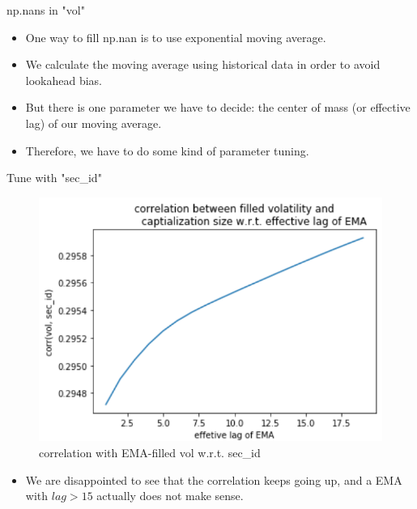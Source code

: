 \documentclass{beamer}
\renewcommand{\indent}{\hspace*{2em}}
\begin{document}

\begin{frame}{np.nans in "vol"}
\begin{itemize}
\item One way to fill np.nan is to use exponential moving average.
\item We calculate the moving average using historical data in order to avoid lookahead bias.
\item But there is one parameter we have to decide: the center of mass (or effective lag) of our moving average.
\item Therefore, we have to do some kind of parameter tuning.
\end{itemize}
\end{frame}

\begin{frame}{Tune with "sec\_id"}
\begin{figure}[ht]
\centering
\includegraphics[scale=0.7]{corr_vol_sec_id.PNG}
\caption{correlation with EMA-filled vol w.r.t. sec\_id}
\label{fig:label}
\end{figure}
\begin{itemize}
\item We are disappointed to see that the correlation keeps going up, and a EMA with  $lag>15$ actually does not make sense.
\end{itemize}
\end{frame}
\end{document}
